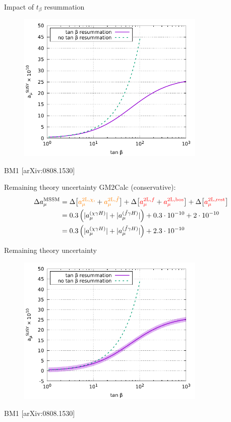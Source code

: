 \documentclass[hyperref={pdfpagelabels=false},ngerman]{beamer}
\newcommand{\MSSM}{\ensuremath{\text{MSSM}}}
\newcommand{\amu}{a_\mu}
\newcommand{\amuMSSM}{\amu^{\MSSM}}
\newcommand{\amuMSSMTwoLBZC}{\amu^{\text{2L},\chi,}}
\newcommand{\amuMSSMTwoLBZf}{\amu^{\text{2L},\tilde{f}}}
\newcommand{\amuMSSMTwoLHf}{\amu^{\text{2L},f}}
\newcommand{\amuMSSMTwoLHV}{\amu^{\text{2L},\text{bos}}}
\newcommand{\amuMSSMTwoLrest}{\amu^{\text{2L,rest}}}
\begin{document}
\begin{frame}{Impact of $t_\beta$ resummation}
  \begin{figure}
    \centering
    \includegraphics[width=0.8\textwidth]{plots/tb_resummation}
  \end{figure}
  BM1 [arXiv:0808.1530]
\end{frame}

\begin{frame}{Remaining theory uncertainty}
  GM2Calc (conservative):
  \begin{align*}
    \Delta \amuMSSM &=
    \Delta\big[\textcolor{orange}{\amuMSSMTwoLBZC} + \textcolor{orange}{\amuMSSMTwoLBZf}\big]
    +\Delta\big[\textcolor{red}{\amuMSSMTwoLHf} + \textcolor{red}{\amuMSSMTwoLHV}\big]
    +\Delta\big[\textcolor{red}{\amuMSSMTwoLrest}\big]\\
    &= 0.3 \left( |a_\mu^{(\chi\gamma H)}| + |a_\mu^{(\tilde{f}\gamma H)}| \right)
    + 0.3 \cdot 10^{-10} + 2 \cdot 10^{-10}\\
    &= 0.3 \left( |a_\mu^{(\chi\gamma H)}| + |a_\mu^{(\tilde{f}\gamma H)}| \right)
    + 2.3\cdot 10^{-10}
  \end{align*}
\end{frame}

\begin{frame}{Remaining theory uncertainty}
  \begin{figure}
    \centering
    \includegraphics[width=0.8\textwidth]{plots/tb_resummation_uncertainty}
  \end{figure}
  BM1 [arXiv:0808.1530]
\end{frame}
\end{document}
